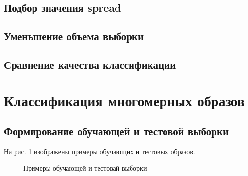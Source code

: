 \subsection{Подбор значения spread}


\subsection{Уменьшение объема выборки}


\subsection{Сравнение качества классификации}


\newpage

\section{Классификация многомерных образов}

\subsection{Формирование обучающей и тестовой выборки}


На рис. \ref{fig:5_1} изображены примеры обучающих и тестовых образов.
\begin{figure}[H]
\begin{center}
	\caption{Примеры обучающей и тестовай выборки}
	\label{fig:5_1}
\end{center}
\end{figure}

